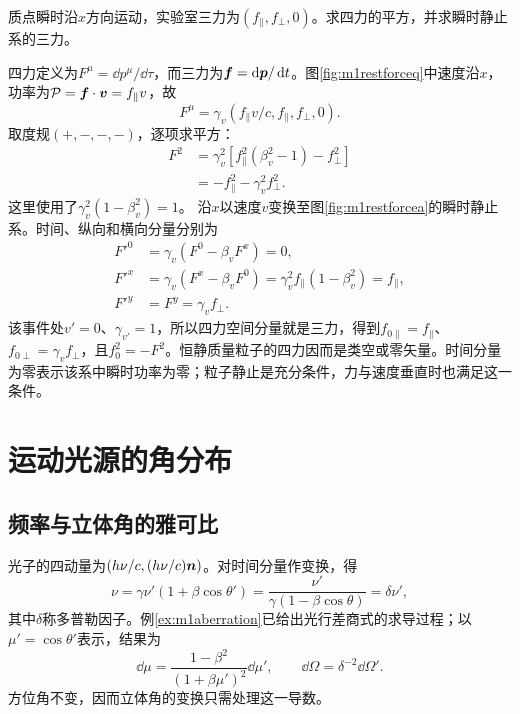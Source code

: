\begin{example}\label{ex:m1restforce}
质点瞬时沿$x$方向运动，实验室三力为$(f_\parallel,f_\perp,0)$。求四力的平方，并求瞬时静止系的三力。
\end{example}
\begin{solution}
四力定义为$F^\mu=\dd p^\mu/\dd\tau$，而三力为$\bm{f}=\mathop{}\!\mathrm d\bm{p}/\mathop{}\!\mathrm d t$。图\ref{fig:m1restforceq}中速度沿$x$，功率为$\mathcal P=\bm{f}\cdot\bm{v}=f_\parallel v$，故
\[
 F^\mu=\gamma_v(f_\parallel v/c,f_\parallel,f_\perp,0).
\]
取度规$(+,-,-,-)$，逐项求平方：
\begin{align*}
 F^2&=\gamma_v^2[f_\parallel^2(\beta_v^2-1)-f_\perp^2]\\
 &=-f_\parallel^2-\gamma_v^2f_\perp^2.
\end{align*}
这里使用了$\gamma_v^2(1-\beta_v^2)=1$。
沿$x$以速度$v$变换至图\ref{fig:m1restforcea}的瞬时静止系。时间、纵向和横向分量分别为
\begin{align*}
 F'^0&=\gamma_v(F^0-\beta_vF^x)=0,\\
 F'^x&=\gamma_v(F^x-\beta_vF^0)
 =\gamma_v^2f_\parallel(1-\beta_v^2)=f_\parallel,\\
 F'^y&=F^y=\gamma_v f_\perp.
\end{align*}
该事件处$v'=0$、$\gamma_{v'}=1$，所以四力空间分量就是三力，得到$f_{0\parallel}=f_\parallel$、$f_{0\perp}=\gamma_vf_\perp$，且$f_0^2=-F^2$。恒静质量粒子的四力因而是类空或零矢量。时间分量为零表示该系中瞬时功率为零；粒子静止是充分条件，力与速度垂直时也满足这一条件。
\end{solution}

\section{运动光源的角分布}
\subsection{频率与立体角的雅可比}
光子的四动量为$(h\nu/c,(h\nu/c)\bm{n})$。对时间分量作变换，得
\[
 \nu=\gamma\nu'(1+\beta\cos\theta')
 =\frac{\nu'}{\gamma(1-\beta\cos\theta)}=\delta\nu',
\]
其中$\delta$称多普勒因子。例\ref{ex:m1aberration}已给出光行差商式的求导过程；以$\mu'=\cos\theta'$表示，结果为
\[
 \dd\mu=\frac{1-\beta^2}{(1+\beta\mu')^2}\dd\mu',
 \qquad \dd\Omega=\delta^{-2}\dd\Omega'.
\]
方位角不变，因而立体角的变换只需处理这一导数。

